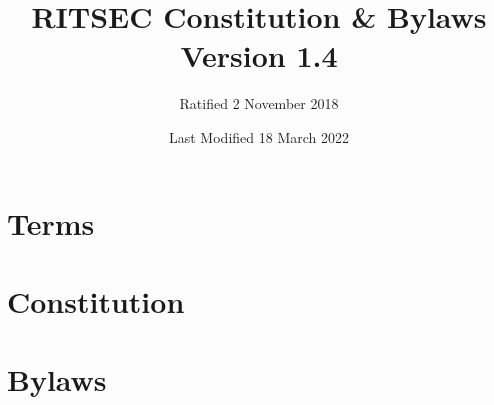 \documentclass{constitution}
\title{RITSEC Constitution \& Bylaws\\ Version 1.4}
\author{Ratified 2 November 2018}
\date{Last Modified 18 March 2022}
\begin{document}
\maketitle
\newpage

\part{Terms}



\newpage

\part{Constitution}












\newpage


\part{Bylaws}




\end{document}
